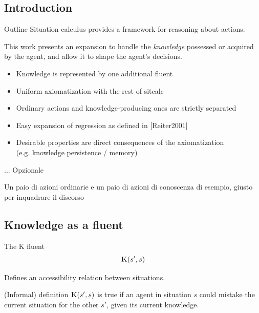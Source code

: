 
\subsection{Introduction}

\begin{frame}{Outline}
    Situation calculus provides a framework for reasoning about actions.

    This work presents an expansion to handle the \textit{knowledge} possessed or acquired by the agent,
    and allow it to shape the agent's decisions.
    \begin{itemize}%
        \item Knowledge is represented by one additional fluent
        \item Uniform axiomatization with the rest of sitcalc
        \item Ordinary actions and knowledge-producing ones are strictly separated
        \item Easy expansion of regression as defined in [Reiter2001]
        \item Desirable properties are direct consequences of the axiomatization \\
                (e.g. knowledge persistence / memory)
    \end{itemize}
\end{frame}

\begin{frame}{...}
    Opzionale

    Un paio di azioni ordinarie e un paio di azioni di conoscenza di esempio, giusto per inquadrare il discorso
\end{frame}

\subsection{Knowledge as a fluent}

\begin{frame}[fragile]{The K fluent}
    \huge
    \[ \textsc{K}(s', s) \]
    \normalsize

    Defines an accessibility relation between situations.


    \begin{block}{(Informal) definition}
        \( \textsc{K}(s',s) \) is true if an agent in situation \(s\)
        could mistake the current situation for the other \(s'\),
        given its current knowledge.
    \end{block}
\end{frame}

